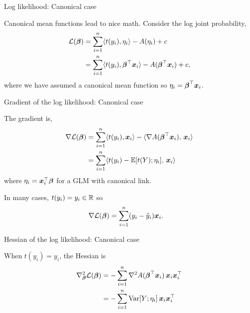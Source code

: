 \documentclass[aspectratio=169]{beamer}
\begin{document}
\begin{frame}[t,allowframebreaks]{Log likelihood: Canonical case}\label{canonical-case}

Canonical mean functions lead to nice math. Consider the log joint
probability, \begin{align*}
    \mathcal{L}(\boldsymbol{\beta}) 
    &= \sum_{i=1}^n \langle t(y_i), \eta_i \rangle - A(\eta_i)  + c \\
    &= \sum_{i=1}^n \langle t(y_i), \boldsymbol{\beta}^\top \boldsymbol{x}_i \rangle - A(\boldsymbol{\beta}^\top \boldsymbol{x}_i) + c,
\end{align*} where we have assumed a canonical mean function so
\(\eta_i = \boldsymbol{\beta}^\top \boldsymbol{x}_i\).
\end{frame}

\begin{frame}[t,allowframebreaks]{Gradient of the log
likelihood: Canonical case}\label{gradient-of-the-log-likelihood}

The gradient is, \begin{align*}
    \nabla \mathcal{L}(\boldsymbol{\beta}) 
    &= \sum_{i=1}^n \langle t(y_i), \boldsymbol{x}_i \rangle - \langle \nabla A(\boldsymbol{\beta}^\top \boldsymbol{x}_i), \, \boldsymbol{x}_i \rangle\\
    &= \sum_{i=1}^n \langle t(y_i) - \mathbb{E}[t(Y); \eta_i], \, \boldsymbol{x}_i \rangle
\end{align*} where \(\eta_i = \boldsymbol{x}_i^\top \boldsymbol{\beta}\) for a GLM with
canonical link.

In many cases, \(t(y_i) = y_i \in \mathbb{R}\) so \begin{align*}
    \nabla \mathcal{L}(\boldsymbol{\beta}) 
    &= \sum_{i=1}^n (y_i - \hat{y}_i) \boldsymbol{x}_i.
\end{align*}
\end{frame}

\begin{frame}[t,allowframebreaks]{Hessian of the log
likelihood: Canonical case}\label{hessian-of-the-log-likelihood}

When \(t(y_i) = y_i\), the Hessian is \begin{align*}
    \nabla^2_{\boldsymbol{\beta}} \mathcal{L}(\boldsymbol{\beta}) 
    &= - \sum_{i=1}^n \nabla^2 A(\boldsymbol{\beta}^\top \boldsymbol{x}_i) \, \boldsymbol{x}_i \boldsymbol{x}_i^\top \\
    &= -\sum_{i=1}^n \textrm{Var}[Y; \eta_i] \, \boldsymbol{x}_i \boldsymbol{x}_i^\top
\end{align*}
\end{frame}
\end{document}
